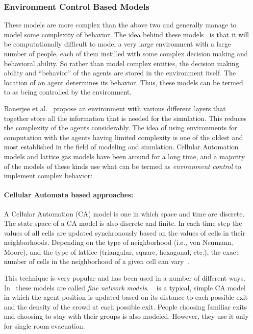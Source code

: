 \subsubsection{Environment Control Based Models}
\label{sec:EnvironmentControlBasedModels}

These models are more complex than the above two and generally manage to model some complexity of behavior. The idea behind these models~\cite{Banerjee:2008jh} is that it will be computationally difficult to model a very large environment with a large number of people, each of them instilled with some complex decision making and behavioral ability. So rather than model complex entities, the decision making ability and ``behavior'' of the agents are stored in the environment itself. The location of an agent determines its behavior. Thus, these models can be termed to as being controlled by the environment.

Banerjee et al.~\cite{Banerjee:2008jh,Banerjee:2009jo} propose an environment with various different layers that together store all the information that is needed for the simulation. This reduces the complexity of the agents considerably. The idea of using environments for computation with the agents having limited complexity is one of the oldest and most established in the field of modeling and simulation. Cellular Automation models and lattice gas models have been around for a long time, and a majority of the models of these kinds use what can be termed as \emph{environment control} to implement complex behavior:

\paragraph{Cellular Automata based approaches:}

 A Cellular Automation (CA) model is one in which space and time are discrete. The state space of a CA model is also discrete and finite. In each time step the values of all cells are updated synchronously based on the values of cells in their neighborhoods. Depending on the type of neighborhood (i.e., von Neumann, Moore), and the type of lattice (triangular, square, hexagonal, etc.), the exact number of cells in the neighborhood of a given cell can vary~\cite{Hoekstra:2010}.

 This technique is very popular and has been used in a number of different ways. In~\cite{Gwynne:1999vi,Kuligowski:2005tt} these models are called \emph{fine network models}.
~\cite{Yuan:2007ja} is a typical, simple CA model in which the agent position is updated based on its distance to each possible exit and the density of the crowd at each possible exit. People choosing familiar exits and choosing to stay with their groups is also modeled. However, they use it only for single room evacuation.

